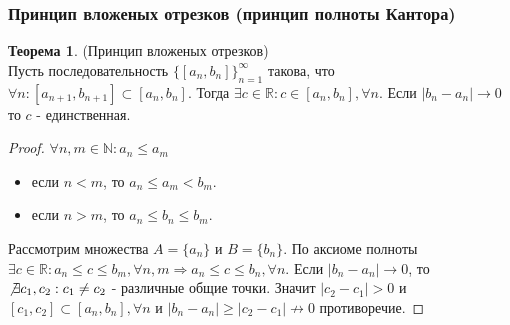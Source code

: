 \documentclass[a4paper, 12pt]{article}
\newcommand{\N}{\mathbb{N}}
\newcommand{\R}{\mathbb{R}}
\theoremstyle{definition}
\newtheorem*{theorem}{Теорема}
\begin{document}
        \subsubsection{Принцип вложеных отрезков (принцип полноты Кантора)}
        \begin{theorem} (Принцип вложеных отрезков) \\
            Пусть последовательность $\{[a_n,b_n]\}_{n=1}^{\infty}$ такова, что $\forall n: [a_{n+1},b_{n+1}]\subset [a_n,b_n]$. Тогда $\exists c\in \R: c\in [a_n,b_n], \forall n$. Если $|b_n-a_n|\to 0$ то $c$ - единственная.
        \end{theorem} 
        \begin{proof}
            $\forall n,m\in \N: a_n\leq a_m$
            \begin{itemize}
                \item если $n<m$, то $a_n\leq a_m<b_m$.
                \item если $n>m$, то $a_n\leq b_n\leq b_m$.
            \end{itemize}
            Рассмотрим множества $A=\{a_n\}$ и $B=\{b_n\}$. По аксиоме полноты $\exists c\in \R: a_n\leq c\leq b_m, \forall n,m \Rightarrow a_n\leq c\leq b_n, \forall n$. Если $|b_n-a_n|\to 0$, то $\not\exists c_1,c_2: c_1\ne c_2$ - различные общие точки. Значит $|c_2-c_1|>0$ и $[c_1,c_2]\subset [a_n,b_n], \forall n$ и $|b_n-a_n|\geq |c_2-c_1|\not\to 0$ противоречие.
        \end{proof}
\end{document}

